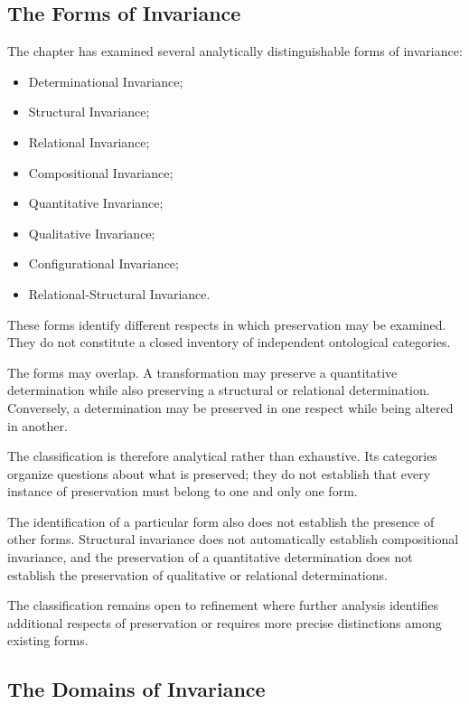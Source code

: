 \subsection{The Forms of Invariance}

The chapter has examined several analytically
distinguishable forms of invariance:

\begin{itemize}
    \item Determinational Invariance;
    \item Structural Invariance;
    \item Relational Invariance;
    \item Compositional Invariance;
    \item Quantitative Invariance;
    \item Qualitative Invariance;
    \item Configurational Invariance;
    \item Relational-Structural Invariance.
\end{itemize}

These forms identify different respects in which
preservation may be examined. They do not constitute
a closed inventory of independent ontological
categories.

The forms may overlap. A transformation may preserve
a quantitative determination while also preserving
a structural or relational determination. Conversely,
a determination may be preserved in one respect
while being altered in another.

The classification is therefore analytical rather
than exhaustive. Its categories organize questions
about what is preserved; they do not establish that
every instance of preservation must belong to one
and only one form.

The identification of a particular form also does
not establish the presence of other forms. Structural
invariance does not automatically establish
compositional invariance, and the preservation of
a quantitative determination does not establish
the preservation of qualitative or relational
determinations.

The classification remains open to refinement
where further analysis identifies additional
respects of preservation or requires more precise
distinctions among existing forms.

\subsection{The Domains of Invariance}

